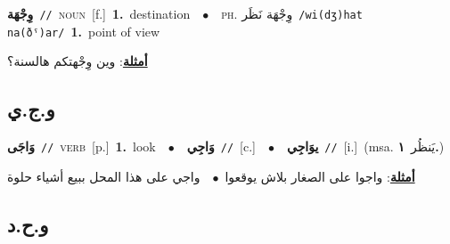\documentclass[10pt,a4paper,twoside]{article} %
\begin{document}
\begin{multicols}{2}
{\setlength\topsep{0pt}\textbf{\foreignlanguage{arabic}{وِجْهَة}}\ {\color{gray}\texttt{//}\color{black}}\ \textsc{noun}\ [f.]\ \textbf{1.}~destination\ \ $\bullet$\ \ \textsc{ph.} \color{gray} \foreignlanguage{arabic}{وِجْهَة نَظَر}\color{black}\ {\color{gray}\texttt{/{\sffamily wi(dʒ)hat na(ðˤ)ar}/}\color{black}}\ \textbf{1.}~point of view\  \begin{flushright}\color{gray}\foreignlanguage{arabic}{\textbf{\underline{\foreignlanguage{arabic}{أمثلة}}}: وين وِجْهتكم هالسنة؟}\end{flushright}\color{black}} \vspace{2mm}

\vspace{-3mm}
\subsection*{\color{blue}\foreignlanguage{arabic}{و.ج.ي}\color{blue}{}} 

{\setlength\topsep{0pt}\textbf{\foreignlanguage{arabic}{وَاجَى}}\ {\color{gray}\texttt{//}\color{black}}\ \textsc{verb}\ [p.]\ \textbf{1.}~look\ \ $\bullet$\ \ \setlength\topsep{0pt}\textbf{\foreignlanguage{arabic}{وَاجِي}}\ {\color{gray}\texttt{//}\color{black}}\ [c.]\ \ $\bullet$\ \ \setlength\topsep{0pt}\textbf{\foreignlanguage{arabic}{يوَاجِي}}\ {\color{gray}\texttt{//}\color{black}}\ [i.]\ \color{gray}(msa. \foreignlanguage{arabic}{يَنظُر}~\foreignlanguage{arabic}{\textbf{١.}})\color{black}\  \begin{flushright}\color{gray}\foreignlanguage{arabic}{\textbf{\underline{\foreignlanguage{arabic}{أمثلة}}}: واجوا على الصغار بلاش يوقعوا\ $\bullet$\ \  واجي على هذا المحل ببيع أشياء حلوة}\end{flushright}\color{black}} \vspace{2mm}

\vspace{-3mm}
\subsection*{\color{blue}\foreignlanguage{arabic}{و.ح.د}\color{blue}{}} 


\end{multicols}
\end{document}
